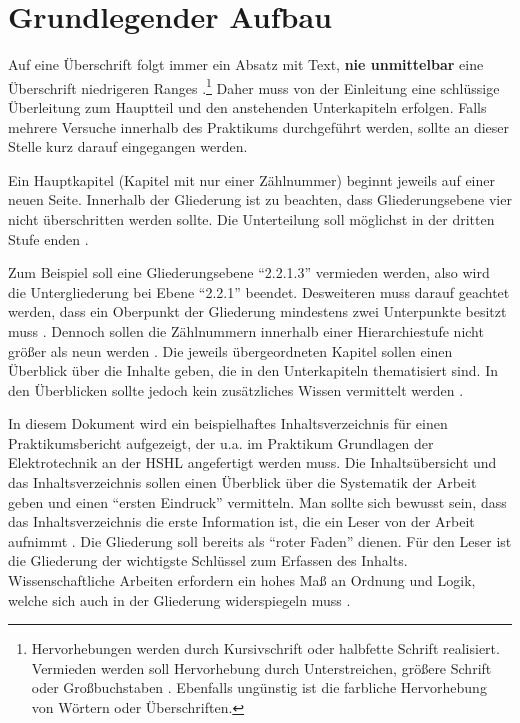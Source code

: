 \section{Grundlegender Aufbau}
Auf eine Überschrift folgt immer ein Absatz mit Text, \textbf{nie unmittelbar} eine Überschrift niedrigeren Ranges \cite[S.~197]{Balz2008}.\footnote{Hervorhebungen werden durch Kursivschrift oder halbfette Schrift realisiert. Vermieden werden soll Hervorhebung durch Unterstreichen, größere Schrift oder Großbuchstaben \cite[S.~182]{Balz2008}. Ebenfalls ungünstig ist die farbliche Hervorhebung von Wörtern oder Überschriften.}
Daher muss von der Einleitung eine schlüssige Überleitung zum Hauptteil und den anstehenden Unterkapiteln erfolgen.
Falls mehrere Versuche innerhalb des Praktikums durchgeführt werden, sollte an dieser Stelle kurz darauf eingegangen werden.

Ein Hauptkapitel (Kapitel mit nur einer Zählnummer) beginnt jeweils auf einer neuen Seite.
Innerhalb der Gliederung ist zu beachten, dass Gliederungsebene vier nicht überschritten werden sollte.
Die Unterteilung soll möglichst in der dritten Stufe enden \cite[S. 12]{Hering2009}.

Zum Beispiel soll eine Gliederungsebene "`2.2.1.3"' vermieden werden, also wird die Untergliederung bei Ebene "`2.2.1"' beendet.
Desweiteren muss darauf geachtet werden, dass ein Oberpunkt der Gliederung mindestens zwei Unterpunkte besitzt muss \cite[S. 53]{Karm2011}.
Dennoch sollen die Zählnummern innerhalb einer Hierarchiestufe nicht größer als neun werden \cite[S.~12]{Hering2009}.
Die jeweils übergeordneten Kapitel sollen einen Überblick über die Inhalte geben, die in den Unterkapiteln thematisiert sind.
In den Überblicken sollte jedoch kein zusätzliches Wissen vermittelt werden \cite[S.~196]{Balz2008}.

In diesem Dokument wird ein beispielhaftes Inhaltsverzeichnis für einen Praktikumsbericht aufgezeigt, der u.a. im Praktikum Grundlagen der Elektrotechnik an der HSHL angefertigt werden muss.
Die Inhaltsübersicht und das Inhaltsverzeichnis sollen einen Überblick über die Systematik der Arbeit geben und einen "`ersten Eindruck"' vermitteln.
Man sollte sich bewusst sein, dass das Inhaltsverzeichnis die erste Information ist, die ein Leser von der Arbeit aufnimmt \cite[S.~49]{Karm2011}.
Die Gliederung soll bereits als "`roter Faden"' dienen.
Für den Leser ist die Gliederung der wichtigste Schlüssel zum Erfassen des Inhalts.
Wissenschaftliche Arbeiten erfordern ein hohes Maß an Ordnung und Logik, welche sich auch in der Gliederung widerspiegeln muss \cite[S.~9 ~ff.]{Hering2009}.

